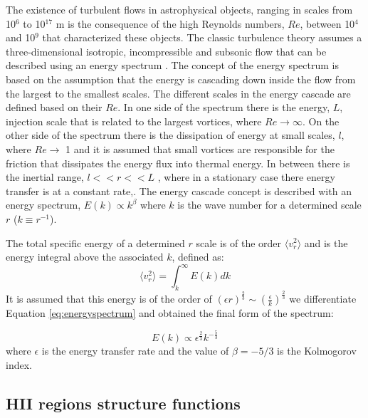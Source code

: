 \documentclass[fleqn,usenatbib, useAMS, a4paper]{mnras}
\begin{document}
The existence of turbulent flows in astrophysical objects, ranging in scales from 10$^{6}$ to 10$^{17}$ m \citep{2010ApJ...710..853C} is the consequence of the high Reynolds numbers, $Re$, between 10$^{4}$ and 10$^{9}$ \citep{1949ApJ...110..329C,lagrois2011} that characterized these objects.
The classic turbulence theory assumes a three-dimensional isotropic, incompressible and subsonic flow that can be described using an energy spectrum \citep{kolm1}.
The concept of the energy spectrum is based on the assumption that the energy is cascading down inside the flow from the largest to the smallest scales.
The different scales in the energy cascade are defined based on their $Re$.
In one side of the spectrum there is the energy, \(L\), injection scale that is related to the largest vortices, where $ Re \rightarrow \infty$.
On the other side of the spectrum there is the dissipation of energy at small scales, \(l\), where $Re \rightarrow$ 1 and it is assumed that small vortices are responsible for the friction that dissipates the energy flux into thermal energy.
In between there is the inertial range, \(l  << r << L\) , where in a stationary case there energy transfer is at a constant rate,.
The energy cascade concept is described with an energy spectrum, $E(k) \propto k^{\beta}$ where $k$ is the wave number for a determined scale $r$ ($k \equiv r^{-1}$).

The total specific energy of a determined $r$ scale is of the order $\langle v_{r}^{2} \rangle$ and is the energy integral above the associated $k$, defined as:
\begin{equation}\label{eq:energyspectrum}
 \langle v_{r}^{2} \rangle = \int_{k}^{\infty} E(k)dk
\end{equation}
%
It is assumed that this energy is of the order of $(\epsilon r)^{\frac{2}{3}} \sim (\frac{\epsilon}{k})^{\frac{2}{3}}$ we differentiate Equation \ref{eq:energyspectrum} and obtained the final form of the spectrum:

\begin{equation}\label{eq:kolm}
E(k) \propto \epsilon^\frac{2}{3} k^{-\frac{5}{3}}
\end{equation}
%
where \(\epsilon\) is the energy transfer rate and the value of $\beta = -5 / 3$ is the Kolmogorov index.


\subsection{HII regions structure functions}
\end{document}
